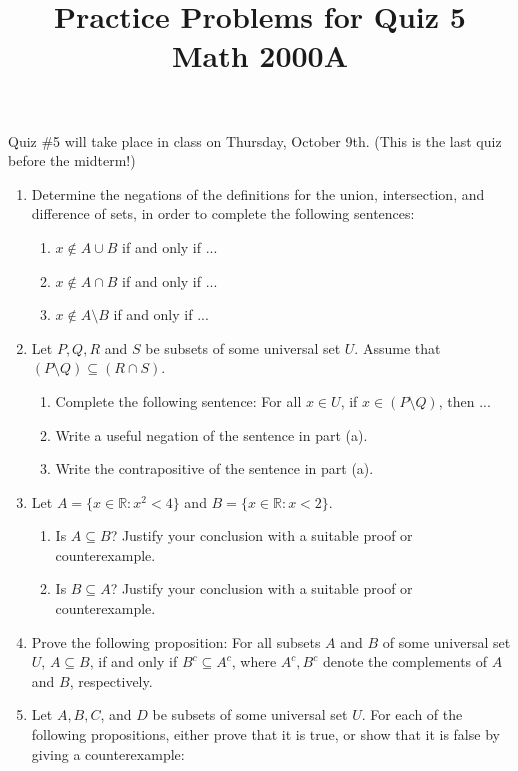 \documentclass[letterpaper,12pt]{article}
\title{Practice Problems for Quiz 5\\Math 2000A}
\date{}
\newcommand{\R}{\mathbb{R}}
\begin{document}
 \maketitle
\vspace{-0.5in}

Quiz \#5 will take place in class on Thursday, October 9th. (This is the last quiz before the midterm!) 

\begin{enumerate}
 \item Determine the negations of the definitions for the union, intersection, and difference of sets, in order to complete the following sentences:
\begin{enumerate}
 \item $x\notin A\cup B$ if and only if ...
 \item $x\notin A\cap B$ if and only if ...
 \item $x\notin A\setminus B$ if and only if ...
\end{enumerate}
 \item Let $P,Q,R$ and $S$ be subsets of some universal set $U$. Assume that $(P\setminus Q)\subseteq (R\cap S)$.
\begin{enumerate}
 \item Complete the following sentence: For all $x\in U$, if $x\in (P\setminus Q)$, then ...
 \item Write a useful negation of the sentence in part (a).
 \item Write the contrapositive of the sentence in part (a).
\end{enumerate}
 \item Let $A = \{x\in\R : x^2<4\}$ and $B = \{x\in\R : x<2\}$.
 \begin{enumerate}
  \item Is $A\subseteq B$? Justify your conclusion with a suitable proof or counterexample.
  \item Is $B\subseteq A$? Justify your conclusion with a suitable proof or counterexample.
 \end{enumerate}
 \item Prove the following proposition: For all subsets $A$ and $B$ of some universal set $U$, $A\subseteq B$, if and only if $B^c\subseteq A^c$, where $A^c,B^c$ denote the complements of $A$ and $B$, respectively.
 \item Let $A,B,C$, and $D$ be subsets of some universal set $U$. For each of the following propositions, either prove that it is true, or show that it is false by giving a counterexample:

\end{enumerate}
\end{document}
